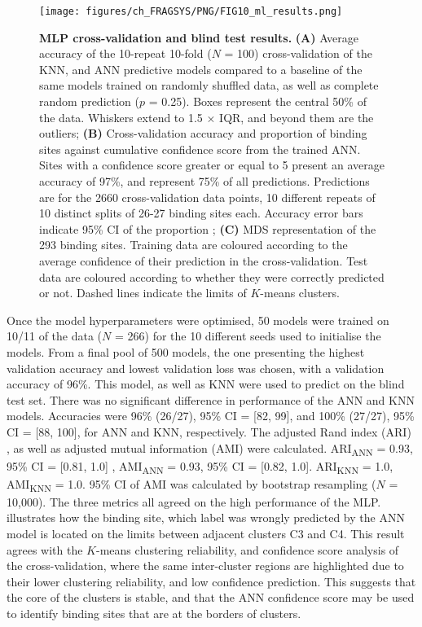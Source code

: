 \begin{figure}[htb!]
    \centering
    \texttt{[image: figures/ch\_FRAGSYS/PNG/FIG10\_ml\_results.png]}
    \caption[MLP cross-validation and blind test results]{\textbf{MLP cross-validation and blind test results.} \textbf{(A)} Average accuracy of the 10-repeat 10-fold ($N$ = 100) cross-validation of the KNN, and ANN predictive models compared to a baseline of the same models trained on randomly shuffled data, as well as complete random prediction ($p$ = 0.25). Boxes represent the central 50\% of the data. Whiskers extend to 1.5 $\times$ IQR, and beyond them are the outliers; \textbf{(B)} Cross-validation accuracy and proportion of binding sites against cumulative confidence score from the trained ANN. Sites with a confidence score greater or equal to 5 present an average accuracy of 97\%, and represent 75\% of all predictions. Predictions are for the 2660 cross-validation data points, 10 different repeats of 10 distinct splits of 26-27 binding sites each. Accuracy error bars indicate 95\% CI of the proportion \cite{WILSON_197_PROP_CI}; \textbf{(C)} MDS representation of the 293 binding sites. Training data are coloured according to the average confidence of their prediction in the cross-validation. Test data are coloured according to whether they were correctly predicted or not. Dashed lines indicate the limits of $K$-means clusters.}
    \label{fig:MLP_CV_blind_test}
\end{figure}

Once the model hyperparameters were optimised, 50 models were trained on 10/11 of the data ($N$ = 266) for the 10 different seeds used to initialise the models. From a final pool of 500 models, the one presenting the highest validation accuracy and lowest validation loss was chosen, with a validation accuracy of 96\%. This model, as well as KNN were used to predict on the blind test set. There was no significant difference in performance of the ANN and KNN models. Accuracies were 96\% (26/27), 95\% CI = [82, 99], and 100\% (27/27), 95\% CI = [88, 100], for ANN and KNN, respectively. The adjusted Rand index (ARI) \cite{RAND_1971_ARI, HUBERT_1985_ARI}, as well as adjusted mutual information (AMI) \cite{VINH_2009_AMI, VINH_2010_AMI} were calculated. ARI\textsubscript{ANN} = 0.93, 95\% CI = [0.81, 1.0] \cite{STEINLEY_2016_ARI}, AMI\textsubscript{ANN} = 0.93, 95\% CI = [0.82, 1.0]. ARI\textsubscript{KNN} = 1.0, AMI\textsubscript{KNN} = 1.0. 95\% CI of AMI was calculated by bootstrap resampling ($N$ = 10,000). The three metrics all agreed on the high performance of the MLP.  illustrates how the binding site, which label was wrongly predicted by the ANN model is located on the limits between adjacent clusters C3 and C4. This result agrees with the $K$-means clustering reliability, and confidence score analysis of the cross-validation, where the same inter-cluster regions are highlighted due to their lower clustering reliability, and low confidence prediction. This suggests that the core of the clusters is stable, and that the ANN confidence score may be used to identify binding sites that are at the borders of clusters.

